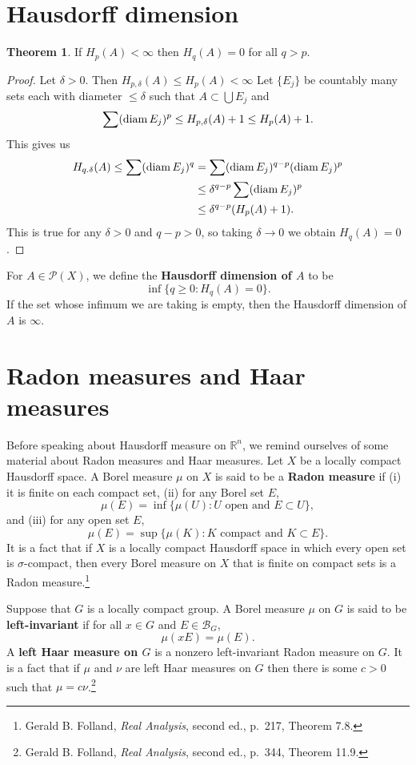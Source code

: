 \documentclass{article}
\newcommand{\diam}{\ensuremath\mathrm{diam}\,}
\theoremstyle{definition}
\newtheorem{theorem}{Theorem}
\theoremstyle{definition}
\begin{document}
\section{Hausdorff dimension}
\begin{theorem}
If $H_p(A)<\infty$ then $H_q(A)=0$ for all $q>p$.
\end{theorem}
\begin{proof}
Let $\delta>0$. Then
$H_{p,\delta}(A) \leq H_p(A)<\infty$
Let $\{E_j\}$ be countably many sets each with diameter $\leq \delta$ such that
$A \subset \bigcup E_j$ and
\[
\sum (\diam E_j)^p \leq H_{p,\delta}(A)+1 \leq H_p(A)+1.
\]
This gives us
\begin{align*}
H_{q.\delta}(A) \leq \sum (\diam E_j)^q &= \sum (\diam E_j)^{q-p} (\diam E_j)^p\\
&\leq \delta^{q-p} \sum (\diam E_j)^p\\
&\leq \delta^{q-p} (H_p(A)+1).
\end{align*}
This is true for any $\delta>0$ and $q-p>0$, so taking $\delta \to 0$ we obtain $H_q(A)=0$.
\end{proof}

For $A \in \mathscr{P}(X)$, we define the \textbf{Hausdorff dimension of $A$} to be 
\[
\inf\{q \geq 0: H_q(A) = 0\}.
\]
If the set whose infimum we are taking is empty, then the Hausdorff dimension of $A$ is $\infty$.



\section{Radon measures and Haar measures}
Before speaking about Hausdorff measure on $\mathbb{R}^n$, we remind ourselves of some material about Radon measures
and  Haar measures.
Let $X$ be a locally compact Hausdorff space. A Borel measure $\mu$ on $X$ is said to be a \textbf{Radon measure} if (i) it is finite
on each compact set, (ii) for any Borel set $E$,
\[
\mu(E) = \inf\{\mu(U): \textrm{$U$ open and $E \subset U$}\},
\]
and (iii) for any open set $E$,
\[
\mu(E) = \sup\{\mu(K): \textrm{$K$ compact and $K \subset E$}\}.
\]
It is a fact that if $X$ is a locally compact Hausdorff space in which every open set is $\sigma$-compact, then every Borel measure on $X$ that
is finite on compact sets
is a Radon measure.\footnote{Gerald B. Folland, {\em Real Analysis}, second ed., p.~217, Theorem 7.8.}

Suppose that $G$ is a locally compact group.
A Borel measure $\mu$ on $G$ is said to be \textbf{left-invariant} if for all $x \in G$ and $E \in \mathscr{B}_G$,
\[
\mu(xE)=\mu(E).
\]
A \textbf{left Haar measure on $G$} is a nonzero left-invariant Radon measure on $G$. 
It is a fact that if $\mu$ and $\nu$ are left Haar measures on $G$ then there is some $c>0$ such that 
$\mu=c\nu$.\footnote{Gerald B. Folland, {\em Real Analysis}, second ed., p.~344, Theorem 11.9.} 
\end{document}
